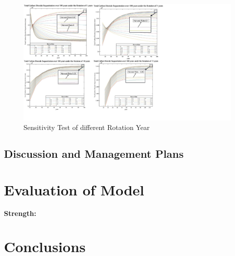 \documentclass{mcmthesis}
\numberwithin{figure}{section}
\numberwithin{table}{section}
\numberwithin{equation}{section}
\begin{document}
\begin{figure}
  \centering
  \includegraphics[width = 17cm]{code&pic/轮伐图.pdf}
  \caption{Sensitivity Test of different Rotation Year}\label{RotationYear}
\end{figure}

\subsection{Discussion and Management Plans}








\section{Evaluation of Model}

\textbf{Strength:}


\section{Conclusions}



\newpage
{}
\memodate{\today}

\begin{memo}

  
\end{memo}




\newpage

\end{document}
